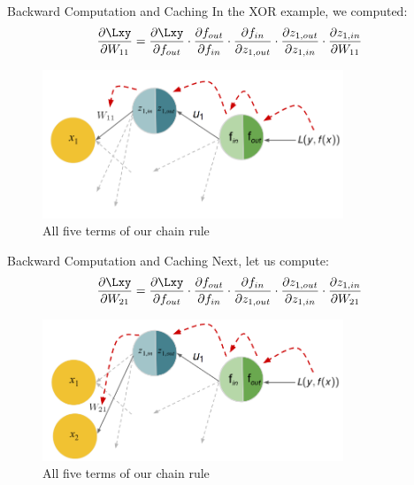 








\begin{frame} {Backward Computation and Caching}
    In the XOR example, we computed:
    $$\frac{\partial \Lxy}{\partial W_{11}} = 
        \frac{\partial \Lxy}{\partial f_{out}} \cdot  \textcolor{black}{\frac{\partial f_{out}}{\partial f_{in}}} \cdot  \textcolor{black}{\frac{\partial f_{in}}{\partial z_{1,out}}} \cdot  \textcolor{black}{\frac{\partial z_{1,out}}{\partial z_{1,in}}} \cdot  \textcolor{black}{\frac{\partial z_{1,in}}{\partial W_{11}}} $$
  \begin{figure}
    \centering
      \includegraphics[width=9cm]{figure/backprop_gg1_new.png}
      \caption{All five terms of our chain rule}
  \end{figure}
\end{frame}

\begin{frame} {Backward Computation and Caching}
Next, let us compute:
      $$\frac{\partial \Lxy}{\partial W_{21}} = 
\frac{\partial \Lxy}{\partial f_{out}} \cdot  \textcolor{black}{\frac{\partial f_{out}}{\partial f_{in}}} \cdot  \textcolor{black}{\frac{\partial f_{in}}{\partial z_{1,out}}} \cdot  \textcolor{black}{\frac{\partial z_{1,out}}{\partial z_{1,in}}} \cdot  \textcolor{black}{\frac{\partial z_{1,in}}{\partial W_{21}}}$$
        \begin{figure}
    \centering
      \includegraphics[width=9cm]{figure/backprop_gg_new.png}
      \caption{All five terms of our chain rule}
  \end{figure}
\end{frame}

